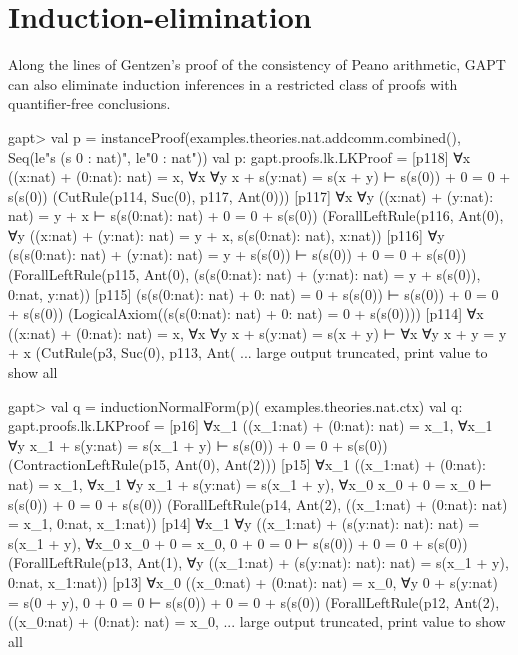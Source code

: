 \documentclass[a4paper,11pt]{book}
\begin{document}
\section{Induction-elimination}

Along the lines of Gentzen's proof of the consistency of Peano arithmetic,
GAPT can also eliminate induction inferences in a restricted class of proofs
with quantifier-free conclusions.

\begin{clilisting}
  gapt> val p = instanceProof(examples.theories.nat.addcomm.combined(),                                     Seq(le"s (s 0 : nat)", le"0 : nat"))
  val p: gapt.proofs.lk.LKProof = [p118] ∀x ((x:nat) + (0:nat): nat) = x,
  ∀x ∀y x + s(y:nat) = s(x + y)
  ⊢
  s(s(0)) + 0 = 0 + s(s(0))    (CutRule(p114, Suc(0), p117, Ant(0)))
  [p117] ∀x ∀y ((x:nat) + (y:nat): nat) = y + x ⊢ s(s(0:nat): nat) + 0 = 0 + s(s(0))    (ForallLeftRule(p116, Ant(0), ∀y ((x:nat) + (y:nat): nat) = y + x, s(s(0:nat): nat), x:nat))
  [p116] ∀y (s(s(0:nat): nat) + (y:nat): nat) = y + s(s(0)) ⊢ s(s(0)) + 0 = 0 + s(s(0))    (ForallLeftRule(p115, Ant(0), (s(s(0:nat): nat) + (y:nat): nat) = y + s(s(0)), 0:nat, y:nat))
  [p115] (s(s(0:nat): nat) + 0: nat) = 0 + s(s(0)) ⊢ s(s(0)) + 0 = 0 + s(s(0))    (LogicalAxiom((s(s(0:nat): nat) + 0: nat) = 0 + s(s(0))))
  [p114] ∀x ((x:nat) + (0:nat): nat) = x,
  ∀x ∀y x + s(y:nat) = s(x + y)
  ⊢
  ∀x ∀y x + y = y + x    (CutRule(p3, Suc(0), p113, Ant( ... large output truncated, print value to show all

  gapt> val q = inductionNormalForm(p)(                                         examples.theories.nat.ctx)
  val q: gapt.proofs.lk.LKProof = [p16] ∀x_1 ((x_1:nat) + (0:nat): nat) = x_1,
  ∀x_1 ∀y x_1 + s(y:nat) = s(x_1 + y)
  ⊢
  s(s(0)) + 0 = 0 + s(s(0))    (ContractionLeftRule(p15, Ant(0), Ant(2)))
  [p15] ∀x_1 ((x_1:nat) + (0:nat): nat) = x_1,
  ∀x_1 ∀y x_1 + s(y:nat) = s(x_1 + y),
  ∀x_0 x_0 + 0 = x_0
  ⊢
  s(s(0)) + 0 = 0 + s(s(0))    (ForallLeftRule(p14, Ant(2), ((x_1:nat) + (0:nat): nat) = x_1, 0:nat, x_1:nat))
  [p14] ∀x_1 ∀y ((x_1:nat) + (s(y:nat): nat): nat) = s(x_1 + y),
  ∀x_0 x_0 + 0 = x_0,
  0 + 0 = 0
  ⊢
  s(s(0)) + 0 = 0 + s(s(0))    (ForallLeftRule(p13, Ant(1), ∀y ((x_1:nat) + (s(y:nat): nat): nat) = s(x_1 + y), 0:nat, x_1:nat))
  [p13] ∀x_0 ((x_0:nat) + (0:nat): nat) = x_0,
  ∀y 0 + s(y:nat) = s(0 + y),
  0 + 0 = 0
  ⊢
  s(s(0)) + 0 = 0 + s(s(0))    (ForallLeftRule(p12, Ant(2), ((x_0:nat) + (0:nat): nat) = x_0, ... large output truncated, print value to show all

\end{clilisting}
\end{document}
